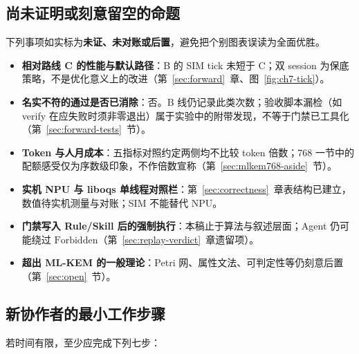 \documentclass[UTF8,a4paper,11pt]{ctexart}
\theoremstyle{definition}
\theoremstyle{plain}
\theoremstyle{remark}
\numberwithin{figure}{section}
\numberwithin{table}{section}
\begin{document}
\subsection{尚未证明或刻意留空的命题}

下列事项如实标为\textbf{未证、未对账或后置}，避免把个别图表误读为全面优胜。

\begin{itemize}
  \item \textbf{相对路线 C 的性能与默认路径}：B 的 SIM tick 未短于 C；双 session 为保底策略，不是优化意义上的改进（第~\ref{sec:forward}~章、图~\ref{fig:ch7-tick}）。
  \item \textbf{名实不符的通过是否已消除}：否。B 线仍记录此类次数；验收脚本漏检（如 verify 在应失败时须非零退出）属于实验中的附带发现，不等于门禁已工具化（第~\ref{sec:forward-tests}~节）。
  \item \textbf{Token 与人月成本}：五指标对照约定两侧均不比较 token 倍数；768 一节中的配额感受仅为序数级印象，不作倍数宣称（第~\ref{sec:mlkem768-aside}~节）。
  \item \textbf{实机 NPU 与 liboqs 单线程对照栏}：第~\ref{sec:correctness}~章表结构已建立，数值待实机测量与对账；SIM 不能替代 NPU。
  \item \textbf{门禁写入 Rule/Skill 后的强制执行}：本稿止于算法与叙述层面；Agent 仍可能绕过 $\mathrm{Forbidden}$（第~\ref{sec:replay-verdict}~章遗留项）。
  \item \textbf{超出 ML-KEM 的一般理论}：Petri 网、属性文法、可判定性等仍刻意后置（第~\ref{sec:open}~节）。
\end{itemize}

\subsection{新协作者的最小工作步骤}

若时间有限，至少应完成下列七步：
\end{document}
